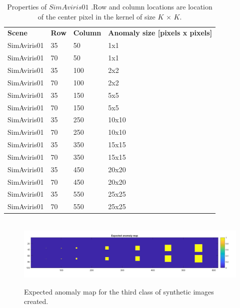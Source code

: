 \begin{table}[H]
\centering
\caption{Properties of $SimAviris01$ .Row and column locations are location of the center pixel in the kernel of size $K$ $\times$ $K$.}
\label{tab:synthetic_images}
\begin{tabular}{l|l|l|l}
\textbf{Scene} & \textbf{Row} & \textbf{Column} & \textbf{Anomaly size {[}pixels x pixels{]}} \\
SimAviris01    & 35           & 50              & 1x1                                         \\
SimAviris01    & 70           & 50              & 1x1                                         \\
SimAviris01    & 35           & 100             & 2x2                                         \\
SimAviris01    & 70           & 100             & 2x2                                         \\
SimAviris01    & 35           & 150             & 5x5                                         \\
SimAviris01    & 70           & 150             & 5x5                                         \\
SimAviris01    & 35           & 250             & 10x10                                       \\
SimAviris01    & 70           & 250             & 10x10                                       \\
SimAviris01   & 35           & 350             & 15x15                                       \\
SimAviris01    & 70           & 350             & 15x15                                       \\
SimAviris01    & 35           & 450             & 20x20                                       \\
SimAviris01    & 70           & 450             & 20x20                                       \\
SimAviris01    & 35           & 550             & 25x25                                       \\
SimAviris01    & 70           & 550             & 25x25                                      
\end{tabular}
\end{table}



\begin{figure}[H]
\hbox{\hspace*{-0}                                              
   \includegraphics[scale=0.4]{images/AD_testing/synthetic_images/expected_anomaly_map.png}}
  \caption{Expected anomaly map for the third class of synthetic images created.} 
  \label{fig:anomaly_map_615_100}
\end{figure}


